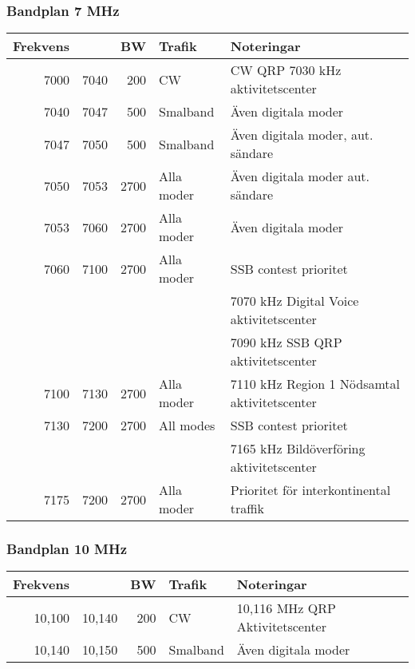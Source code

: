 \begin{landscape}
\subsubsection{Bandplan 7 MHz}
\begin{tabular}{rrrll}
\textbf{Frekvens} &      & \textbf{BW} & \textbf{Trafik} & \textbf{Noteringar}                          \\ \hline
7000              & 7040 & 200         & CW              & CW QRP 7030 kHz aktivitetscenter             \\ \hline
7040              & 7047 & 500         & Smalband        & Även digitala moder                          \\ \hline
7047              & 7050 & 500         & Smalband        & Även digitala moder, aut. sändare            \\ \hline
7050              & 7053 & 2700        & Alla moder      & Även digitala moder aut. sändare             \\ \hline
7053              & 7060 & 2700        & Alla moder      & Även digitala moder                          \\ \hline
7060              & 7100 & 2700        & Alla moder      & SSB contest prioritet                        \\ 
                  &      &             &                 & 7070 kHz Digital Voice aktivitetscenter      \\
                  &      &             &                 & 7090 kHz SSB QRP aktivitetscenter            \\ \hline
7100              & 7130 & 2700        & Alla moder      & 7110 kHz Region 1 Nödsamtal aktivitetscenter \\ \hline
7130              & 7200 & 2700        & All modes       & SSB contest prioritet                        \\
                  &      &             &                 & 7165 kHz Bildöverföring aktivitetscenter     \\\hline
7175              & 7200 & 2700        & Alla moder      & Prioritet för interkontinental traffik       \\ \hline
\end{tabular}
\clearpage

\subsubsection{Bandplan 10 MHz}
\begin{tabular}{rrrll}
\textbf{Frekvens} &        & \textbf{BW} & \textbf{Trafik} & \textbf{Noteringar}             \\ \hline
10,100            & 10,140 & 200         & CW              & 10,116 MHz QRP Aktivitetscenter \\ \hline
10,140            & 10,150 & 500         & Smalband        & Även digitala moder             \\ \hline
\end{tabular}
\clearpage


\end{landscape}

